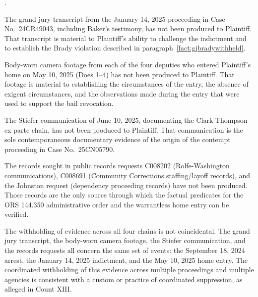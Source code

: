 \documentclass[12pt,letterpaper]{article}
\newcounter{complaintpara}
\newenvironment{paras}{%
	\begin{list}{\arabic{complaintpara}.}{%
			\setlength{\leftmargin}{0.5in}%
			\setlength{\labelwidth}{0.4in}%
			\setlength{\labelsep}{0.1in}%
			\setlength{\itemsep}{0pt}%
			\setlength{\parsep}{0pt}%
			\setlength{\topsep}{6pt}%
		}%
	}{%
	\end{list}%
}
\begin{document}
	\begin{paras}
		
		\item\label{fact:conceal-gj} The grand jury transcript from the
		January 14, 2025 proceeding in Case No.\ 24CR49043, including
		Baker's testimony, has not been produced to Plaintiff. That
		transcript is material to Plaintiff's ability to challenge the
		indictment and to establish the Brady violation described in
		paragraph~\ref{fact:gjbradywithheld}.
		
		\item\label{fact:conceal-bwc} Body-worn camera footage from each
		of the four deputies who entered Plaintiff's home on May 10,
		2025 (Does 1--4) has not been produced to Plaintiff. That
		footage is material to establishing the circumstances of the
		entry, the absence of exigent circumstances, and the
		observations made during the entry that were used to support
		the bail revocation.
		
		\item\label{fact:conceal-stiefer} The Stiefer communication of
		June 10, 2025, documenting the Clark-Thompson ex parte chain,
		has not been produced to Plaintiff. That communication is the
		sole contemporaneous documentary evidence of the origin of the
		contempt proceeding in Case No.\ 25CN05790.
		
		\item\label{fact:conceal-records} The records sought in public
		records requests C008202 (Rolfe-Washington communications),
		C008691 (Community Corrections staffing/layoff records), and
		the Johnston request (dependency proceeding records) have not
		been produced. Those records are the only source through which
		the factual predicates for the ORS 144.350 administrative
		order and the warrantless home entry can be verified.
		
		\item\label{fact:conceal-pattern} The withholding of evidence
		across all four chains is not coincidental. The grand jury
		transcript, the body-worn camera footage, the Stiefer
		communication, and the records requests all concern the same
		set of events: the September 18, 2024 arrest, the January 14,
		2025 indictment, and the May 10, 2025 home entry. The
		coordinated withholding of this evidence across multiple
		proceedings and multiple agencies is consistent with a custom
		or practice of coordinated suppression, as alleged in
		Count XIII.
		
	\end{paras}
\end{document}
